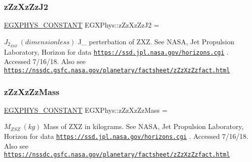 \subsubsection{\texorpdfstring{z\+Zz\+Xz\+Zz\+J2}{zZzXzZzJ2}}
{\footnotesize\ttfamily \mbox{\hyperlink{group___e_g_x_phys-_constants-_macros_ga76980d288494ce1714c9ac68a95ba702}{E\+G\+X\+P\+H\+Y\+S\+\_\+\+C\+O\+N\+S\+T\+A\+NT}} E\+G\+X\+Phys\+::z\+Zz\+Xz\+Zz\+J2 =}

$ J_{2}_{ZSZ} \ (dimensionless)$ J\+\_ perterbation of Z\+XZ. See N\+A\+SA, Jet Propulsion Laboratory, Horizon for data \href{https://ssd.jpl.nasa.gov/horizons.cgi}{\tt https\+://ssd.\+jpl.\+nasa.\+gov/horizons.\+cgi} . Accessed 7/16/18. Also see \href{https://nssdc.gsfc.nasa.gov/planetary/factsheet/zZzXzZzfact.html}{\tt https\+://nssdc.\+gsfc.\+nasa.\+gov/planetary/factsheet/z\+Zz\+Xz\+Zzfact.\+html} \mbox{\label{group___e_g_x_phys-_constants-_astrophysics-_solar_system-_z_x_z-_bulk_ga8554bdc0f00df9945573f97fd6c1c684}} 
\subsubsection{\texorpdfstring{z\+Zz\+Xz\+Zz\+Mass}{zZzXzZzMass}}
{\footnotesize\ttfamily \mbox{\hyperlink{group___e_g_x_phys-_constants-_macros_ga76980d288494ce1714c9ac68a95ba702}{E\+G\+X\+P\+H\+Y\+S\+\_\+\+C\+O\+N\+S\+T\+A\+NT}} E\+G\+X\+Phys\+::z\+Zz\+Xz\+Zz\+Mass =}

$M_{ZSZ} \ (kg)$ Mass of Z\+XZ in kilograms. See N\+A\+SA, Jet Propulsion Laboratory, Horizon for data \href{https://ssd.jpl.nasa.gov/horizons.cgi}{\tt https\+://ssd.\+jpl.\+nasa.\+gov/horizons.\+cgi} . Accessed 7/16/18. Also see \href{https://nssdc.gsfc.nasa.gov/planetary/factsheet/zZzXzZzfact.html}{\tt https\+://nssdc.\+gsfc.\+nasa.\+gov/planetary/factsheet/z\+Zz\+Xz\+Zzfact.\+html} \mbox{\label{group___e_g_x_phys-_constants-_astrophysics-_solar_system-_z_x_z-_bulk_ga3e49db9f81c952a2e1445e9e50ccc164}} 
